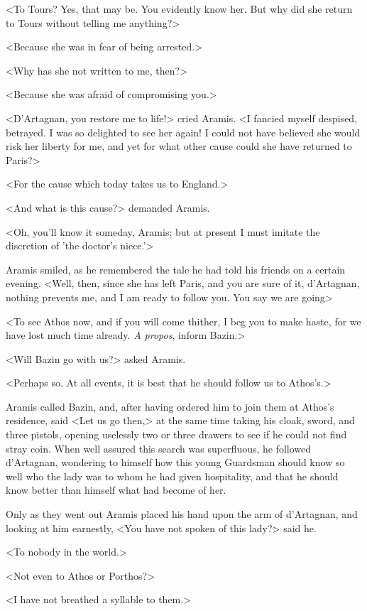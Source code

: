 <To Tours? Yes, that may be. You evidently know her. But why did she return to Tours without telling me anything?> 

<Because she was in fear of being arrested.> 

<Why has she not written to me, then?> 

<Because she was afraid of compromising you.> 

<D'Artagnan, you restore me to life!> cried Aramis. <I fancied myself despised, betrayed. I was so delighted to see her again! I could not have believed she would risk her liberty for me, and yet for what other cause could she have returned to Paris?> 

<For the cause which today takes us to England.> 

<And what is this cause?> demanded Aramis. 

<Oh, you'll know it someday, Aramis; but at present I must imitate the discretion of 'the doctor's niece.'> 

Aramis smiled, as he remembered the tale he had told his friends on a certain evening. <Well, then, since she has left Paris, and you are sure of it, d'Artagnan, nothing prevents me, and I am ready to follow you. You say we are going\longdash> 

<To see Athos now, and if you will come thither, I beg you to make haste, for we have lost much time already. \textit{A propos}, inform Bazin.> 

<Will Bazin go with us?> asked Aramis. 

<Perhaps so. At all events, it is best that he should follow us to Athos's.> 

Aramis called Bazin, and, after having ordered him to join them at Athos's residence, said <Let us go then,> at the same time taking his cloak, sword, and three pistols, opening uselessly two or three drawers to see if he could not find stray coin. When well assured this search was superfluous, he followed d'Artagnan, wondering to himself how this young Guardsman should know so well who the lady was to whom he had given hospitality, and that he should know better than himself what had become of her. 

Only as they went out Aramis placed his hand upon the arm of d'Artagnan, and looking at him earnestly, <You have not spoken of this lady?> said he. 

<To nobody in the world.> 

<Not even to Athos or Porthos?> 

<I have not breathed a syllable to them.> 

